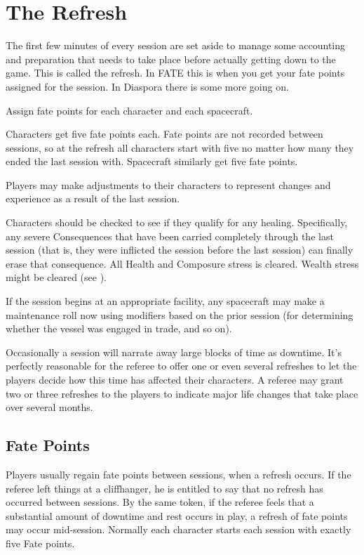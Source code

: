 \section{The Refresh}
\label{sec:the-refresh}

The first few minutes of every session are set aside to manage some accounting and preparation that needs to take place before actually getting down to the game. This is called the refresh. In FATE this is when you get your fate points assigned for the session. In Diaspora there is some more going on.

Assign fate points for each character and each spacecraft.

Characters get five fate points each. Fate points are not recorded between sessions, so at the refresh all characters start with five no matter how many they ended the last session with. Spacecraft similarly get five fate points.

Players may make adjustments to their characters to represent changes and experience as a result of the last session.

Characters should be checked to see if they qualify for any healing. Specifically, any severe Consequences that have been carried completely through the last session (that is, they were inflicted the session before the last session) can finally erase that consequence. All Health and Composure stress is cleared. Wealth stress might be cleared (see ).

If the session begins at an appropriate facility, any spacecraft may make a maintenance roll now using modifiers based on the prior session (for determining whether the vessel was engaged in trade, and so on).

Occasionally a session will narrate away large blocks of time as downtime. It's perfectly reasonable for the referee to offer one or even several refreshes to let the players decide how this time has affected their characters. A referee may grant two or three refreshes to the players to indicate major life changes that take place over several months.

\subsection{Fate Points}\label{sec:Fate Points} %

Players usually regain fate points between sessions, when a refresh occurs. If the referee left things at a cliffhanger, he is entitled to say that no refresh has occurred between sessions. By the same token, if the referee feels that a substantial amount of downtime and rest occurs in play, a refresh of fate points may occur mid-session. Normally each character starts each session with exactly five Fate points.

